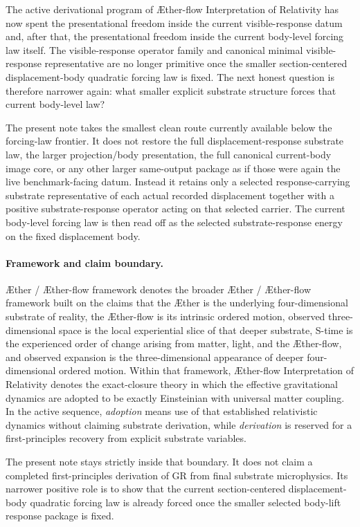 \documentclass[11pt]{article}
\newcommand{\Aether}{\AE{}ther}
\newcommand{\Aflow}{\AE{}ther-flow}
\newcommand{\TheoryName}{\Aflow{} Interpretation of Relativity}
\newcommand{\TheoryProgram}{\Aether{} / \Aflow{} framework}
\begin{document}
The active derivational program of \TheoryName{} has now spent the presentational freedom inside the current visible-response datum and, after that, the presentational freedom inside the current body-level forcing law itself. The visible-response operator family and canonical minimal visible-response representative are no longer primitive once the smaller section-centered displacement-body quadratic forcing law is fixed. The next honest question is therefore narrower again: what smaller explicit substrate structure forces that current body-level law?

The present note takes the smallest clean route currently available below the forcing-law frontier. It does not restore the full displacement-response substrate law, the larger projection/body presentation, the full canonical current-body image core, or any other larger same-output package as if those were again the live benchmark-facing datum. Instead it retains only a selected response-carrying substrate representative of each actual recorded displacement together with a positive substrate-response operator acting on that selected carrier. The current body-level forcing law is then read off as the selected substrate-response energy on the fixed displacement body.

\paragraph{Framework and claim boundary.}
\TheoryProgram{} denotes the broader \Aether{} / \Aflow{} framework built on the claims that the \Aether{} is the underlying four-dimensional substrate of reality, the \Aflow{} is its intrinsic ordered motion, observed three-dimensional space is the local experiential slice of that deeper substrate, S-time is the experienced order of change arising from matter, light, and the \Aflow{}, and observed expansion is the three-dimensional appearance of deeper four-dimensional ordered motion. Within that framework, \TheoryName{} denotes the exact-closure theory in which the effective gravitational dynamics are adopted to be exactly Einsteinian with universal matter coupling. In the active sequence, \emph{adoption} means use of that established relativistic dynamics without claiming substrate derivation, while \emph{derivation} is reserved for a first-principles recovery from explicit substrate variables.

The present note stays strictly inside that boundary. It does not claim a completed first-principles derivation of GR from final substrate microphysics. Its narrower positive role is to show that the current section-centered displacement-body quadratic forcing law is already forced once the smaller selected body-lift response package is fixed.
\end{document}
